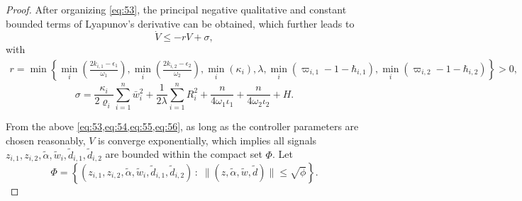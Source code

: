 \documentclass[pdflatex,sn-mathphys-num]{sn-jnl}%
\theoremstyle{thmstyleone}%
\theoremstyle{thmstyletwo}%
\theoremstyle{thmstylethree}%
\begin{document}
\begin{proof}
After organizing \cref{eq:53}, the principal negative qualitative and constant bounded terms of Lyapunov's derivative can be obtained, which further leads to
\begin{equation}\label{eq:54}
\dot{V}\le -r  V+\sigma,
		\end{equation}
with
\begin{equation}\label{eq:55}
\begin{aligned}
r = \min \left\{
	\min_{i}\left(\frac{2 k_{i,1}-\epsilon_1}{\omega_{1}}\right), \min_{i}\left(\frac{2 k_{i,2}-\epsilon_2}{\omega_{2}}\right),
      \min_{i}(\kappa_i), \lambda, \min_{i}\left(\varpi_{i,1}-1-\hbar_{i,1}\right), \min_{i}\left(\varpi_{i,2}-1-\hbar_{i,2}\right)
\right\}>0,
\end{aligned}
\end{equation}
\begin{equation}\label{eq:56}
	\sigma =\frac{\kappa_i}{2\varrho_i}\sum_{i=1}^n \bar w_i^2 +\frac{1}{2\lambda} \sum_{i=1}^{n}R_{i}^2 + \frac{n}{4  \omega_{1} \iota_1 }+ \frac{n}{4  \omega_{2}\iota_2 }+H.
\end{equation} 



From the above \cref{eq:53,eq:54,eq:55,eq:56}, as long as the controller parameters are chosen reasonably, $V$ is converge exponentially, which implies all signals $z_{i,1}, z_{i,2}, {\tilde{\alpha}}, \tilde w_i, \tilde{d}_{i,1}, \tilde{d}_{i,2}$ are bounded within the compact set $\Phi$. Let
\begin{equation}\label{eq:57}
	\Phi =\left\{ (z_{i,1},z_{i,2},\tilde\alpha,\tilde w_i,\tilde d_{i,1},\tilde d_{i,2})\,:\;
	\|(z,\tilde\alpha,\tilde w,\tilde d)\|\le \sqrt{\phi}\right\}.
\end{equation}



\end{proof}
\end{document}
